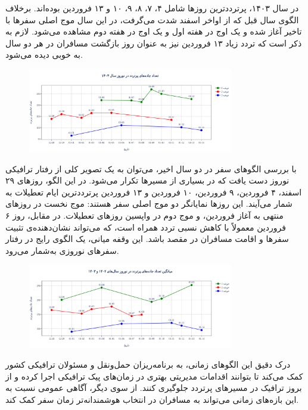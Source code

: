 \documentclass[a4paper, 12pt]{article}
\begin{document}
در سال ۱۴۰۳، پرترددترین روزها شامل ۴، ۷، ۸، ۹، ۱۰ و ۱۳ فروردین بوده‌اند. برخلاف الگوی سال قبل که از اواخر اسفند شدت می‌گرفت، در این سال موج اصلی سفرها با تاخیر آغاز شده و یک اوج در هفته اول و یک اوج در هفته دوم مشاهده می‌شود. لازم به ذکر است که تردد زیاد ۱۳ فروردین نیز به عنوان روز بازگشت مسافران در هر دو سال به خوبی دیده می‌شود.


\begin{figure}[htbp]
    \centering
    \includegraphics[width=0.8\textwidth]{peaks-pics/cluster1403.png}
\end{figure}

با بررسی الگوهای سفر در دو سال اخیر، می‌توان به یک تصویر کلی از رفتار ترافیکی نوروز دست یافت که در بسیاری از مسیرها تکرار می‌شود. در این الگو، روزهای ۲۹ اسفند، ۴ فروردین، ۹ فروردین، ۱۰ فروردین و ۱۳ فروردین پرترددترین ایام تعطیلات به شمار می‌آیند. این روزها نمایانگر دو موج اصلی سفر هستند: موج نخست در روزهای منتهی به آغاز فروردین، و موج دوم در واپسین روزهای تعطیلات. در مقابل، روز ۶ فروردین معمولاً با کاهش نسبی تردد همراه است، که می‌تواند نشان‌دهنده‌ی تثبیت سفرها و اقامت مسافران در مقصد باشد. این وقفه میانی، یک الگوی رایج در رفتار سفرهای نوروزی به‌شمار می‌رود.

\begin{figure}[H]
    \centering
    \includegraphics[width=0.8\textwidth]{peaks-pics/clustermean.png}
\end{figure}

درک دقیق این الگوهای زمانی، به برنامه‌ریزان حمل‌ونقل و مسئولان ترافیکی کشور کمک می‌کند تا بتوانند اقدامات مدیریتی بهتری در زمان‌های پیک ترافیکی اجرا کرده و از بروز ترافیک در مسیرهای پرتردد جلوگیری کنند. از سوی دیگر، آگاهی عمومی نسبت به این بازه‌های زمانی می‌تواند به مسافران در انتخاب هوشمندانه‌تر زمان سفر کمک کند.
\end{document}
